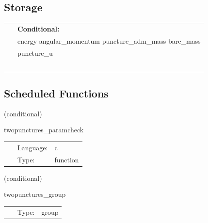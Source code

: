 \subsection*{Storage}

\hspace{5mm}

 \begin{tabular*}{160mm}{ll} 
~& {\bf Conditional:} \\ 
~ &  energy angular\_momentum puncture\_adm\_mass bare\_mass\\ 
~ &  puncture\_u\\ 
~ & ~\\ 
\end{tabular*} 


\subsection*{Scheduled Functions}
\vspace{5mm}

   (conditional) 

\hspace{5mm} twopunctures\_paramcheck 

\hspace{5mm}{\it check parameters and thorn needs } 


\hspace{5mm}

 \begin{tabular*}{160mm}{cll} 
~ & Language:  & c \\ 
~ & Type:  & function \\ 
\end{tabular*} 


\vspace{5mm}

   (conditional) 

\hspace{5mm} twopunctures\_group 

\hspace{5mm}{\it twopunctures initial data group } 


\hspace{5mm}

 \begin{tabular*}{160mm}{cll} 
~ & Type:  & group \\ 
\end{tabular*} 


\vspace{5mm}

